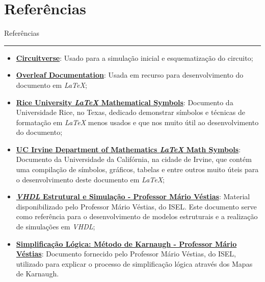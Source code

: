 \documentclass[12pt]{article}
\begin{document}
\newpage
\pagestyle{referencias}

\section*{Referências} \label{Referências}
{\protect\numberline{}Referências}
\hrule
\vspace{0.5cm}

\begin{itemize}
    \item \href{https://circuitverse.org/}{\textbf{Circuitverse}}: Usado para a simulação inicial e esquematização do circuito;
    
    \item \textbf{\href{https://www.overleaf.com/learn}{\textbf{Overleaf Documentation}}}: Usada em recurso para desenvolvimento do documento em \textit{LaTeX};
    
    \item \href{https://www.cmor-faculty.rice.edu/~heinken/latex/symbols.pdf}{\textbf{Rice University \textit{LaTeX} Mathematical Symbols}}: Documento da Universidade Rice, no Texas, dedicado demonstrar símbolos e técnicas de formatação em \textit{LaTeX} menos usados e que nos muito útil ao desenvolvimento do documento;
    
    \item \href{https://www.math.uci.edu/~xiangwen/pdf/LaTeX-Math-Symbols.pdf}{\textbf{UC Irvine Department of Mathematics \textit{LaTeX} Math Symbols}}: Documento da Universidade da Califórnia, na cidade de Irvine, que contém uma compilação de símbolos, gráficos, tabelas e entre outros muito úteis para o desenvolvimento deste documento em \textit{LaTeX};
    
    \item \href{https://2425moodle.isel.pt/pluginfile.php/1261036/mod_folder/content/0/VHDL%20parte2.pdf?forcedownload=0}{\textbf{\textit{VHDL} Estrutural e Simulação - Professor Mário Véstias}}: Material disponibilizado pelo Professor Mário Véstias, do ISEL. Este documento serve como referência para o desenvolvimento de modelos estruturais e a realização de simulações em \textit{VHDL};

    \item \href{https://2425moodle.isel.pt/pluginfile.php/1254903/mod_folder/content/0/Aula%20T4%20-%20Mapas%20de%20Karnaugh.pdf?forcedownload=0}{\textbf{Simplificação Lógica: Método de Karnaugh - Professor Mário Véstias}}: Documento fornecido pelo Professor Mário Véstias, do ISEL, utilizado para explicar o processo de simplificação lógica através dos Mapas de Karnaugh.

\end{itemize}
\end{document}
